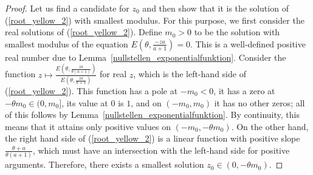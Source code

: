 \documentclass[12pt]{article}
\newcommand{\1}{\mathds{1}}
\theoremstyle{definition}
\theoremstyle{plain}
\theoremstyle{remark}
\begin{document}
\begin{proof}
Let us find a candidate for $z_0$ and then show that it is the solution of (\ref{root_yellow_2}) with smallest modulus. For this purpose, we first consider the real solutions of (\ref{root_yellow_2}). Define $m_0>0$ to be the solution with smallest modulus of the equation $E(\theta,\frac{-za}{a+1})=0$. This is a well-defined positive real number due to Lemma~\ref{nullstellen_exponentialfunktion}. Consider the function $z\mapsto \frac{E\left(\theta,\frac{za}{\theta(a+1)}\right)}{E\left(\theta,\frac{za}{a+1}\right)}$ for real $z$, which is the left-hand side of (\ref{root_yellow_2}). This function has a pole at $-m_0<0$, it has a zero at $-\theta m_0\in(0,m_0]$, its value at $0$ is $1$, and on $(-m_0,m_0)$ it has no other zeros; all of this follows by Lemma~\ref{nullstellen_exponentialfunktion}. By continuity, this means that it attains only positive values on $(-m_0,-\theta m_0)$. On the other hand, the right hand side of (\ref{root_yellow_2}) is a linear function with positive slope $\frac{\theta+a}{\theta(a+1)}$, which must have an intersection with the left-hand side for positive arguments. Therefore, there exists a smallest solution $z_0\in(0,-\theta m_0)$. %


\end{proof}
\end{document}
